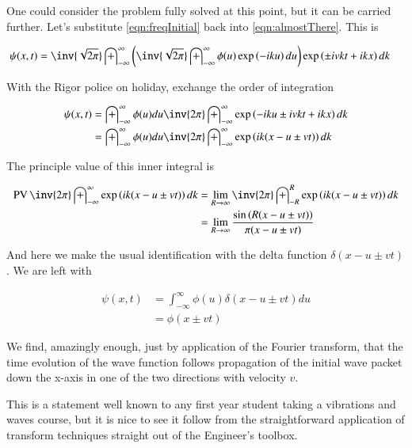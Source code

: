 \documentclass{article}
\DeclareMathOperator{\PV}{PV}
\newcommand{\IIinf}[0]{ \int_{-\infty}^\infty }
\begin{document}
One could consider the problem fully solved at this point, but it can be carried further.  Let's substitute 
\ref{eqn:freqInitial} back into \ref{eqn:almostThere}.  This is

\begin{align*}
{\psi}(x,t) &= \inv{\sqrt{2\pi}} \IIinf \left( \inv{\sqrt{2\pi}} \IIinf \phi(u) \exp\left( -i k u \right) du \right) \exp\left( \pm i v k t + i k x \right) dk
\end{align*}

With the Rigor police on holiday, exchange the order of integration

\begin{align*}
{\psi}(x,t) 
&= \IIinf \phi(u) du \inv{{2\pi}} \IIinf \exp\left( -i k u \pm i v k t + i k x \right) dk \\
&= \IIinf \phi(u) du \inv{{2\pi}} \IIinf \exp\left( i k (x - u \pm v t ) \right) dk \\
\end{align*}

The principle value of this inner integral is

\begin{align*}
\PV \inv{{2\pi}} \IIinf \exp\left( i k (x - u \pm v t ) \right) dk 
&= \lim_{R\rightarrow \infty} \inv{2\pi} \int_{-R}^R \exp\left( i k (x - u \pm v t ) \right) dk  \\
&= \lim_{R\rightarrow \infty} \frac{\sin\left( R (x - u \pm v t ) \right) }{ \pi (x - u \pm v t) } \\
\end{align*}

And here we make the usual identification with the delta function $\delta( x - u \pm v t )$.  We are left with

\begin{align*}
{\psi}(x,t) 
&= \IIinf \phi(u) \delta( x - u \pm v t ) du \\
&= \phi( x \pm v t )
\end{align*}

We find, amazingly enough, just by application of the Fourier transform, that the time evolution of the
wave function follows propagation of the initial wave packet down the x-axis in one of the two directions with velocity $v$.

This is a statement well known to any first year student taking a vibrations and waves course, but it is nice to see 
it follow from the straightforward application of transform techniques straight out of the Engineer's toolbox.
\end{document}
